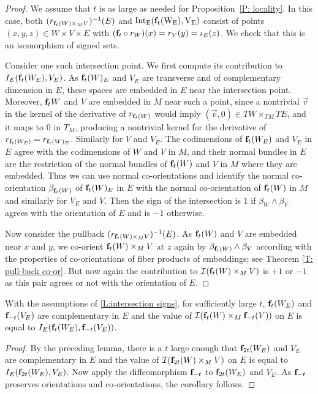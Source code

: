 \begin{proof}
	We assume that $t$ is as large as needed for Proposition~\ref{P: locality}.
	In this case, both $(r_{\mathbf{f}_t(W) \times_M V})^{-1}(E)$ and $\rm{Int}_E(\mathbf{f}_t(W_E), V_E)$ consist of points $(x,y,z) \in W \times V \times E$ with $(\mathbf{f}_t \circ r_W)(x) = r_V (y) = \iota_E(z)$.
	We check that this is an isomorphism of signed sets.

	Consider one such intersection point.
	We first compute its contribution to $I_E(\mathbf{f}_t(W_E), V_E)$.
	As $\mathbf{f}_t(W)_E$ and $V_E$ are transverse and of complementary dimension in $E$, these spaces are embedded in $E$ near the intersection point.
	Moreover, $\mathbf{f}_t W$ and $V$ are embedded in $M$ near such a point, since a nontrivial $\vec v$ in the kernel of the derivative of $r_{\mathbf{f}_t (W)}$ would imply $(\vec v,0)\in TW\times_{TM} TE$, and it maps to $0$ in $T_M$, producing a nontrivial kernel for the derivative of $r_{\mathbf{f}_t(W_E)}=r_{\mathbf{f}_t(W)_E}$.
	Similarly for $V$ and $V_E$.
	The codimensions of $\mathbf{f}_t (W_E)$ and $V_E$ in $E$ agree with the codimensions of $W$ and $V$ in $M$, and their normal bundles in $E$ are the restriction of the normal bundles of $\mathbf{f}_t(W)$ and $V$ in $M$ where they are embedded.
	Thus we can use normal co-orientations and identify the normal co-orientation $\beta_{\mathbf{f}_t(W)}$ of $\mathbf{f}_t(W)_E$ in $E$ with the normal co-orientation of $\mathbf{f}_t(W)$ in $M$ and similarly for $V_E$ and $V$.
	Then the sign of the intersection is $1$ if $\beta_W \wedge \beta_V$ agrees with the orientation of $E$ and is $-1$ otherwise.

	Now consider the pullback $(r_{\mathbf{f}_t(W) \times_M V})^{-1}(E)$.
	As $\mathbf{f}_t( W)$ and $V$ are embedded near $x$ and $y$, we co-orient $\mathbf{f}_t(W) \times_M V$ at $z$ again by $\beta_{\mathbf{f}_t(W)} \wedge \beta_V$ according with the properties of co-orientations of fiber products of embeddings; see Theorem \ref{T: pull-back co-or}.
	But now again the contribution to $\mathcal{I}(\mathbf{f}_t(W) \times_M V)$ is $+1$ or $-1$ as this pair agrees or not with the orientation of $E$.
\end{proof}

\begin{corollary}\label{C:intersection signs}
	With the assumptions of \cref{L:intersection signs}, for sufficiently large $t$, $\mathbf{f}_t(W_E)$ and $\mathbf{f}_{-t}(V_E)$ are complementary in $E$ and the value of $\mathcal{I}(\mathbf{f}_t(W) \times_M \mathbf{f}_{-t}(V))$ on $E$ is equal to $I_E(\mathbf{f}_t(W_E), \mathbf{f}_{-t}(V_E))$.
\end{corollary}

\begin{proof}
	By the preceding lemma, there is a $t$ large enough that $\mathbf{f}_{2t}(W_E)$ and $V_E$ are complementary in $E$ and the value of $\mathcal{I}(\mathbf{f}_{2t}(W) \times_M V)$ on $E$ is equal to $I_E(\mathbf{f}_{2t}(W_E), V_E)$.
	Now apply the diffeomorphism $\mathbf{f}_{-t}$ to $\mathbf{f}_{2t}(W_E)$ and $V_E$.
	As $\mathbf{f}_{-t}$ preserves orientations and co-orientations, the corollary follows.
\end{proof}

